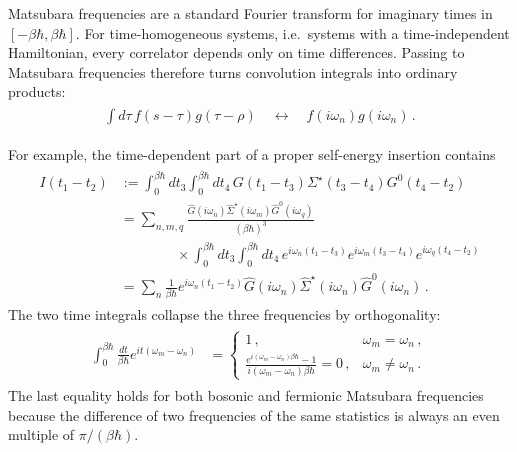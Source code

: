 \documentclass[../QFT_main.tex]{subfiles}
\begin{document}
\begin{mytheorem}
Matsubara frequencies are a standard Fourier transform for imaginary times in $[-\beta\hbar,\beta\hbar]$.
For time-homogeneous systems, i.e.\ systems with a time-independent Hamiltonian, every correlator depends only on time differences.
Passing to Matsubara frequencies therefore turns convolution integrals into ordinary products:
{\small\begin{align}\begin{aligned}
    \int d\tau\,f(s-\tau)g(\tau-\rho)
    \quad\longleftrightarrow\quad
    f(i\omega_n)g(i\omega_n)\,.
\end{aligned}\end{align}}

For example, the time-dependent part of a proper self-energy insertion contains
{\small\begin{align}\begin{aligned}
    I(t_1-t_2)
    &:=
    \int_0^{\beta\hbar}dt_3
    \int_0^{\beta\hbar}dt_4\,
    G(t_1-t_3)
    \Sigma^\star(t_3-t_4)
    G^0(t_4-t_2)
    \\
    &=
    \sum_{n,m,q}
    \tfrac{
        \widehat G(i\omega_n)
        \widehat\Sigma^\star(i\omega_m)
        \widehat G^0(i\omega_q)
    }{(\beta\hbar)^3}
    \\
    &\qquad\qquad\times
    \int_0^{\beta\hbar}dt_3
    \int_0^{\beta\hbar}dt_4\,
    e^{i\omega_n(t_1-t_3)}
    e^{i\omega_m(t_3-t_4)}
    e^{i\omega_q(t_4-t_2)}
    \\
    &=
    \sum_n\tfrac{1}{\beta\hbar}
    e^{i\omega_n(t_1-t_2)}
    \widehat G(i\omega_n)
    \widehat\Sigma^\star(i\omega_n)
    \widehat G^0(i\omega_n)\,.
\end{aligned}\end{align}}
The two time integrals collapse the three frequencies by orthogonality:
{\small\begin{align}\begin{aligned}
    \int_0^{\beta\hbar}
    \tfrac{dt}{\beta\hbar}
    e^{it(\omega_m-\omega_n)}
    &=
    \begin{cases}
        1\,,&\omega_m=\omega_n\,,\\[0.4em]
        \displaystyle
        \tfrac{
            e^{i(\omega_m-\omega_n)\beta\hbar}-1
        }{
            i(\omega_m-\omega_n)\beta\hbar
        }
        =0\,,&\omega_m\neq\omega_n\,.
    \end{cases}
\end{aligned}\end{align}}
The last equality holds for both bosonic and fermionic Matsubara frequencies because the difference of two frequencies of the same statistics is always an even multiple of $\pi/(\beta\hbar)$.
\end{mytheorem}
\end{document}
